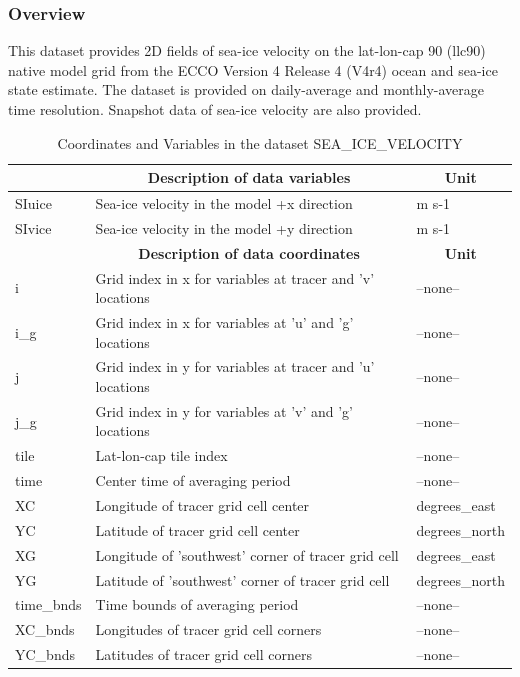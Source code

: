 \subsubsection{Overview}
This dataset provides 2D fields of sea-ice velocity on the lat-lon-cap 90 (llc90) native model grid from the ECCO Version 4 Release 4 (V4r4) ocean and sea-ice state estimate. The dataset is provided on daily-average and monthly-average time resolution. Snapshot data of sea-ice velocity are also provided. 
\begin{longtable}{|m{}|m{}|m{}|}
\caption{Coordinates and Variables in the dataset SEA\_ICE\_VELOCITY}
\label{tab:table-SEA_ICE_VELOCITY-fields} \\ 
\hline \endhead \hline \endfoot
\rowcolor{lightgray} \multicolumn{1}{|c|}{\textbf{Variables}} & \multicolumn{1}{|c|}{\textbf{Description of data variables}} &  \multicolumn{1}{|c|}{\textbf{Unit}}\\ \hline
SIuice &Sea-ice velocity in the model +x direction  &m s-1  \\ \hline
SIvice &Sea-ice velocity in the model +y direction  &m s-1  \\ \hline
\rowcolor{lightgray} \multicolumn{1}{|c|}{\textbf{Coordinates}} & \multicolumn{1}{|c|}{\textbf{Description of data coordinates}} &  \multicolumn{1}{|c|}{\textbf{Unit}}\\ \hline
i &Grid index in x for variables at tracer and 'v' locations &--none--  \\ \hline
i\_g &Grid index in x for variables at 'u' and 'g' locations &--none--  \\ \hline
j &Grid index in y for variables at tracer and 'u' locations &--none--  \\ \hline
j\_g &Grid index in y for variables at 'v' and 'g' locations &--none--  \\ \hline
tile &Lat-lon-cap tile index &--none--  \\ \hline
time &Center time of averaging period &--none--  \\ \hline
XC &Longitude of tracer grid cell center &degrees\_east  \\ \hline
YC &Latitude of tracer grid cell center &degrees\_north  \\ \hline
XG &Longitude of 'southwest' corner of tracer grid cell &degrees\_east  \\ \hline
YG &Latitude of 'southwest' corner of tracer grid cell &degrees\_north  \\ \hline
time\_bnds &Time bounds of averaging period &--none--  \\ \hline
XC\_bnds &Longitudes of tracer grid cell corners &--none--  \\ \hline
YC\_bnds &Latitudes of tracer grid cell corners &--none--  \\ \hline
\end{longtable}

